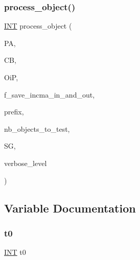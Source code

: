 \mbox{\label{projective__space__main_8_c_a63a6b06bd2a9a9c50ed710271f4d5530}} 
\subsubsection{\texorpdfstring{process\+\_\+object()}{process\_object()}}
{\footnotesize\ttfamily \mbox{\hyperlink{galois_8h_a09fddde158a3a20bd2dcadb609de11dc}{I\+NT}} process\+\_\+object (\begin{DoxyParamCaption}\item[{\mbox{\hyperlink{classprojective__space__with__action}{projective\+\_\+space\+\_\+with\+\_\+action}} $\ast$}]{PA,  }\item[{\mbox{\hyperlink{classclassify__bitvectors}{classify\+\_\+bitvectors}} $\ast$}]{CB,  }\item[{\mbox{\hyperlink{classobject__in__projective__space}{object\+\_\+in\+\_\+projective\+\_\+space}} $\ast$}]{OiP,  }\item[{\mbox{\hyperlink{galois_8h_a09fddde158a3a20bd2dcadb609de11dc}{I\+NT}}}]{f\+\_\+save\+\_\+incma\+\_\+in\+\_\+and\+\_\+out,  }\item[{const \mbox{\hyperlink{galois_8h_ab6cc7b4aeb6ea31aba2b3fbfc83ff5e6}{B\+Y\+TE}} $\ast$}]{prefix,  }\item[{\mbox{\hyperlink{galois_8h_a09fddde158a3a20bd2dcadb609de11dc}{I\+NT}}}]{nb\+\_\+objects\+\_\+to\+\_\+test,  }\item[{\mbox{\hyperlink{classstrong__generators}{strong\+\_\+generators}} $\ast$\&}]{SG,  }\item[{\mbox{\hyperlink{galois_8h_a09fddde158a3a20bd2dcadb609de11dc}{I\+NT}}}]{verbose\+\_\+level }\end{DoxyParamCaption})}



\subsection{Variable Documentation}
\mbox{\label{projective__space__main_8_c_a4268f4fe222ffb119218a0199f5e1904}} 
\subsubsection{\texorpdfstring{t0}{t0}}
{\footnotesize\ttfamily \mbox{\hyperlink{galois_8h_a09fddde158a3a20bd2dcadb609de11dc}{I\+NT}} t0}

